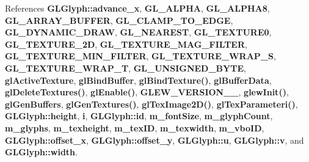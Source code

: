 References {\bf G\+L\+Glyph\+::advance\+\_\+x}, {\bf G\+L\+\_\+\+A\+L\+P\+HA}, {\bf G\+L\+\_\+\+A\+L\+P\+H\+A8}, {\bf G\+L\+\_\+\+A\+R\+R\+A\+Y\+\_\+\+B\+U\+F\+F\+ER}, {\bf G\+L\+\_\+\+C\+L\+A\+M\+P\+\_\+\+T\+O\+\_\+\+E\+D\+GE}, {\bf G\+L\+\_\+\+D\+Y\+N\+A\+M\+I\+C\+\_\+\+D\+R\+AW}, {\bf G\+L\+\_\+\+N\+E\+A\+R\+E\+ST}, {\bf G\+L\+\_\+\+T\+E\+X\+T\+U\+R\+E0}, {\bf G\+L\+\_\+\+T\+E\+X\+T\+U\+R\+E\+\_\+2D}, {\bf G\+L\+\_\+\+T\+E\+X\+T\+U\+R\+E\+\_\+\+M\+A\+G\+\_\+\+F\+I\+L\+T\+ER}, {\bf G\+L\+\_\+\+T\+E\+X\+T\+U\+R\+E\+\_\+\+M\+I\+N\+\_\+\+F\+I\+L\+T\+ER}, {\bf G\+L\+\_\+\+T\+E\+X\+T\+U\+R\+E\+\_\+\+W\+R\+A\+P\+\_\+S}, {\bf G\+L\+\_\+\+T\+E\+X\+T\+U\+R\+E\+\_\+\+W\+R\+A\+P\+\_\+T}, {\bf G\+L\+\_\+\+U\+N\+S\+I\+G\+N\+E\+D\+\_\+\+B\+Y\+TE}, {\bf gl\+Active\+Texture}, {\bf gl\+Bind\+Buffer}, {\bf gl\+Bind\+Texture()}, {\bf gl\+Buffer\+Data}, {\bf gl\+Delete\+Textures()}, {\bf gl\+Enable()}, {\bf G\+L\+E\+W\+\_\+\+V\+E\+R\+S\+I\+O\+N\+\_\+\_}, {\bf glew\+Init()}, {\bf gl\+Gen\+Buffers}, {\bf gl\+Gen\+Textures()}, {\bf gl\+Tex\+Image2\+D()}, {\bf gl\+Tex\+Parameteri()}, {\bf G\+L\+Glyph\+::height}, {\bf i}, {\bf G\+L\+Glyph\+::id}, {\bf m\+\_\+font\+Size}, {\bf m\+\_\+glyph\+Count}, {\bf m\+\_\+glyphs}, {\bf m\+\_\+texheight}, {\bf m\+\_\+tex\+ID}, {\bf m\+\_\+texwidth}, {\bf m\+\_\+vbo\+ID}, {\bf G\+L\+Glyph\+::offset\+\_\+x}, {\bf G\+L\+Glyph\+::offset\+\_\+y}, {\bf G\+L\+Glyph\+::u}, {\bf G\+L\+Glyph\+::v}, and {\bf G\+L\+Glyph\+::width}.



